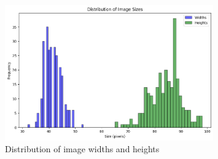 \begin{figure}[H]
  \centering
  \includegraphics[width=0.8\textwidth]{imgs/graphs/pixel_distrib.png}
  \caption{Distribution of image widths and heights}
  \label{fig:pixel-distrib}
\end{figure}

